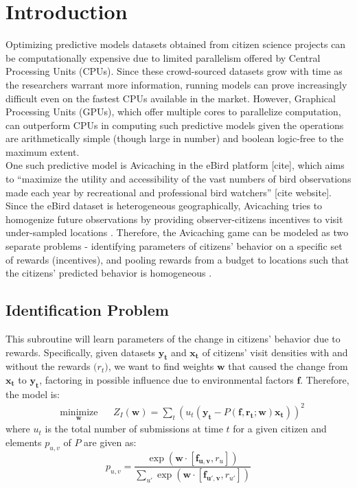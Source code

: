 \documentclass[12pt]{article}
\newcommand{\vect}[1]{\mathbf{#1}}
\newcommand{\matr}[1]{\mathbf{#1}}
\begin{document}
    \tableofcontents
    \listoftables
    \listoffigures
    \section{Introduction} \label{sec:introduction}
    Optimizing predictive models datasets obtained from citizen science projects can be computationally expensive due to limited parallelism offered by Central Processing Units (CPUs). Since these crowd-sourced datasets grow with time as the researchers warrant more information, running models can prove increasingly difficult even on the fastest CPUs available in the market. However, Graphical Processing Units (GPUs), which offer multiple cores to parallelize computation, can outperform CPUs in computing such predictive models given the operations are arithmetically simple (though large in number) and boolean logic-free to the maximum extent.\\
    
    One such predictive model is Avicaching \cite{Xue2016Avi1} in the eBird platform [cite], which aims to ``maximize the utility and accessibility of the vast numbers of bird observations made each year by recreational and professional bird watchers'' [cite website]. Since the eBird dataset is heterogeneous geographically, Avicaching tries to homogenize future observations by providing observer-citizens incentives to visit under-sampled locations \cite{Xue2016Avi1}. Therefore, the Avicaching game can be modeled as two separate problems - identifying parameters of citizens' behavior on a specific set of rewards (incentives), and pooling rewards from a budget to locations such that the citizens' predicted behavior is homogeneous \cite{Xue2016Avi2}.
    
    \subsection{Identification Problem} \label{sec:iden_problem}
    This subroutine will learn parameters of the change in citizens' behavior due to rewards. Specifically, given datasets $\vect{y_t}$ and $\vect{x_t}$ of citizens' visit densities with and without the rewards $\vect(r_t)$, we want to find weights $\matr{w}$ that caused the change from $\vect{x_t}$ to $\vect{y_t}$, factoring in possible influence due to environmental factors $\matr{f}$. Therefore, the model is:
    \begin{equation} \label{eq:iden_problem}
    \begin{aligned}
    & \underset{\matr{w}}{\text{minimize}}
    & & Z_I(\matr{w}) = \sum_{t} (u_t(\vect{y_t} - P(\matr{f}, \vect{r_t}; \matr{w})\vect{x_t}))^{2}
    \end{aligned}
    \end{equation}
    where $u_t$ is the total number of submissions at time $t$ for a given citizen and elements $p_{u, v}$ of $P$ are given as:
    \begin{equation} \label{eq:puv_equation}
    p_{u, v} = \frac{\exp{(\matr{w} \cdot [\vect{f_{u, v}}, r_{u}])}}{\sum_{u'} \exp{(\matr{w} \cdot [\vect{f_{u', v}}, r_{u'}])}}
    \end{equation}
    
\end{document}
